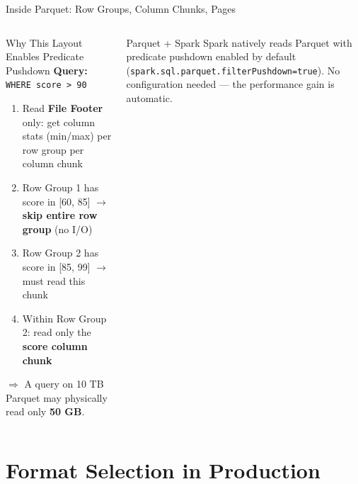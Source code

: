 \documentclass[aspectratio=169,10pt]{beamer}
\begin{document}
\begin{frame}{Inside Parquet: Row Groups, Column Chunks, Pages}
\begin{columns}[T]
      \begin{exampleblock}{Why This Layout Enables Predicate Pushdown}
        \small
        \textbf{Query:} \texttt{WHERE score > 90}
        \vspace{4pt}
        \begin{enumerate}
          \item Read \textbf{File Footer} only: get column stats (min/max) per row group per column chunk
          \item Row Group 1 has score in [60, 85] $\to$ \textbf{skip entire row group} (no I/O)
          \item Row Group 2 has score in [85, 99] $\to$ must read this chunk
          \item Within Row Group 2: read only the \textbf{score column chunk}
        \end{enumerate}
        \vspace{4pt}
        $\Rightarrow$ A query on 10 TB Parquet may physically read only \textbf{50 GB}.
      \end{exampleblock}
      \vspace{4pt}
      \begin{alertblock}{Parquet + Spark}
        \small Spark natively reads Parquet with predicate pushdown enabled by default (\texttt{spark.sql.parquet.filterPushdown=true}).  No configuration needed — the performance gain is automatic.
      \end{alertblock}
  \end{columns}
\end{frame}

\section{Format Selection in Production}
\end{document}
